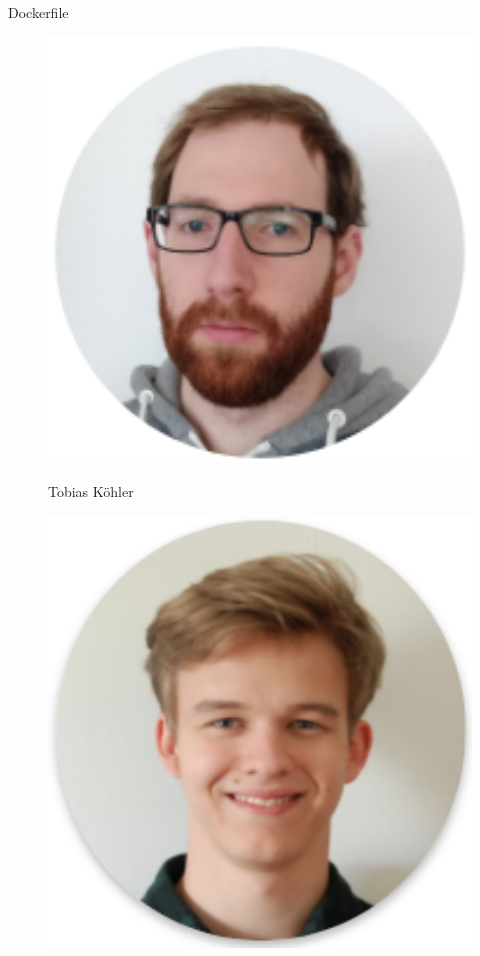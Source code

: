 \documentclass[final]{beamer}
\newlength{\onecolwid}
\begin{document}
\begin{frame}
\begin{columns}[t]
\begin{column}{\onecolwid}
\begin{block}{Dockerfile}
\begin{figure}
\begin{minipage}[t]{0.40\textwidth}\vspace{0pt} 
\includegraphics[width=1.0\textwidth]{tobiaskohler} 
\begin{center}
	Tobias Köhler
\end{center}
\end{minipage}\hfill%
\begin{minipage}[t]{0.40\textwidth}\vspace{0pt} 
\includegraphics[width=1.0\textwidth]{niklasnikisch} 

\end{minipage}
\end{figure}
\end{block}
\end{column}
\end{columns}
\end{frame}
\end{document}
